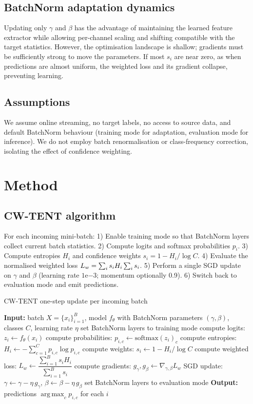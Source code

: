 \documentclass{article} %
\begin{document}
\subsection{BatchNorm adaptation dynamics}
Updating only \(\gamma\) and \(\beta\) has the advantage of maintaining the learned feature extractor while allowing per-channel scaling and shifting compatible with the target statistics. However, the optimisation landscape is shallow; gradients must be sufficiently strong to move the parameters. If most \(s_i\) are near zero, as when predictions are almost uniform, the weighted loss and its gradient collapse, preventing learning.

\subsection{Assumptions}
We assume online streaming, no target labels, no access to source data, and default BatchNorm behaviour (training mode for adaptation, evaluation mode for inference). We do not employ batch renormalisation or class-frequency correction, isolating the effect of confidence weighting.

\section{Method}
\label{sec:method}
\subsection{CW-TENT algorithm}
For each incoming mini-batch: 1) Enable training mode so that BatchNorm layers collect current batch statistics. 2) Compute logits and softmax probabilities \(p_i\). 3) Compute entropies \(H_i\) and confidence weights \(s_i = 1 - H_i/\log C\). 4) Evaluate the normalised weighted loss \(L_w = \sum_i s_i H_i \/ \sum_i s_i\). 5) Perform a single SGD update on \(\gamma\) and \(\beta\) (learning rate \(1\mathrm{e}{-3}\); momentum optionally 0.9). 6) Switch back to evaluation mode and emit predictions.

\begin{algorithm}[H]
\caption{CW-TENT one-step update per incoming batch}
\begin{algorithmic}[1]
  \State \textbf{Input:} batch \(X = \{x_i\}_{i=1}^{B}\), model \(f_{\theta}\) with BatchNorm parameters \((\gamma, \beta)\), classes \(C\), learning rate \(\eta\)
  \State set BatchNorm layers to training mode
  \State compute logits: \(z_i \leftarrow f_{\theta}(x_i)\)
  \State compute probabilities: \(p_{i,c} \leftarrow \mathrm{softmax}(z_i)_c\)
  \State compute entropies: \(H_i \leftarrow -\sum_{c=1}^{C} p_{i,c} \log p_{i,c}\)
  \State compute weights: \(s_i \leftarrow 1 - H_i/\log C\)
  \State compute weighted loss: \(L_w \leftarrow \dfrac{\sum_{i=1}^{B} s_i H_i}{\sum_{i=1}^{B} s_i}\)
  \State compute gradients: \(g_{\gamma}, g_{\beta} \leftarrow \nabla_{\gamma,\beta} L_w\)
  \State SGD update: \(\gamma \leftarrow \gamma - \eta\, g_{\gamma}\), \(\beta \leftarrow \beta - \eta\, g_{\beta}\)
  \State set BatchNorm layers to evaluation mode
  \State \textbf{Output:} predictions \(\operatorname*{arg\,max}_c p_{i,c}\) for each \(i\)
\end{algorithmic}
\end{algorithm}
\end{document}
